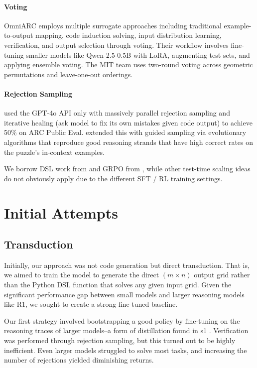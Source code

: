 \documentclass{article}
\begin{document}
\paragraph{Voting} OmniARC \cite{OmniARC} employs multiple surrogate approaches including traditional example-to-output mapping, code induction solving, input distribution learning, verification, and output selection through voting. Their workflow involves fine-tuning smaller models like Qwen-2.5-0.5B with LoRA, augmenting test sets, and applying ensemble voting. The MIT team uses two-round voting across geometric permutations and leave-one-out orderings.

\paragraph{Rejection Sampling} \cite{Greenblatt} used the GPT-4o API only with massively parallel rejection sampling and iterative healing (ask model to fix its own mistakes given code output) to achieve 50\% on ARC Public Eval. \cite{Jeremy} extended this with guided sampling via evolutionary algorithms that reproduce good reasoning strands that have high correct rates on the puzzle's in-context examples.

We borrow DSL work from \cite{Hodel} and GRPO from \cite{GRPO}, while other test-time scaling ideas do not obviously apply due to the different SFT / RL training settings.

\section{Initial Attempts}

\subsection{Transduction}

Initially, our approach was not code generation but direct transduction. That is, we aimed to train the model to generate the direct $(m \times n)$ output grid rather than the Python DSL function that solves any given input grid. Given the significant performance gap between small models and larger reasoning models like R1, we sought to create a strong fine-tuned baseline.

Our first strategy involved bootstrapping a good policy by fine-tuning on the reasoning traces of larger models--a form of distillation found in s1 \cite{s1}. Verification was performed through rejection sampling, but this turned out to be highly inefficient. Even larger models struggled to solve most tasks, and increasing the number of rejections yielded diminishing returns.
\end{document}
